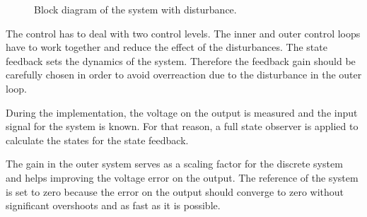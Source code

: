 \begin{figure}[H]


\caption{Block diagram of the system with disturbance.}
\label{fig:block_dist}
\end{figure}

The control has to deal with two control levels. The inner and outer control loops have to work together and reduce the effect of the disturbances. The state feedback sets the dynamics of the system. Therefore the feedback gain should be carefully chosen in order to avoid overreaction due to the disturbance in the outer loop. 

During the implementation, the voltage on the output is measured and the input signal for the system is known. For that reason, a full state observer is applied to calculate the states for the state feedback. 

The gain in the outer system serves as a scaling factor for the discrete system and helps improving the voltage error on the output. The reference of the system is set to zero because the error on the output should converge to zero without significant overshoots and as fast as it is possible. 
